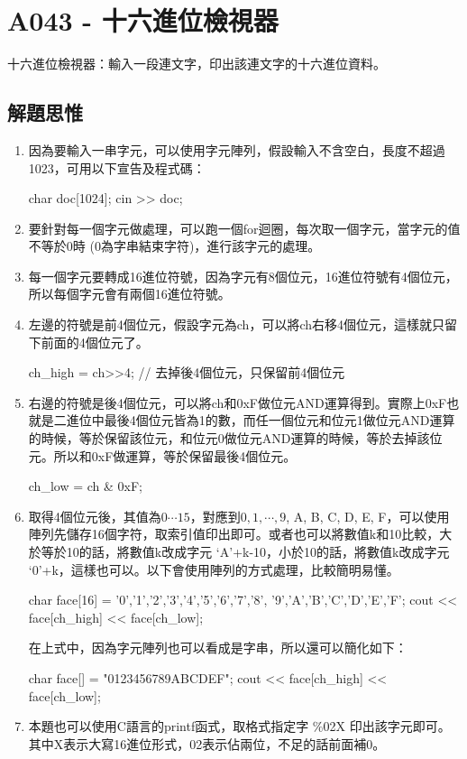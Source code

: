 \section{A043 - 十六進位檢視器}
十六進位檢視器：輸入一段連文字，印出該連文字的十六進位資料。

\subsection{解題思惟}
\begin{enumerate}
\item 因為要輸入一串字元，可以使用字元陣列，假設輸入不含空白，長度不超過1023，可用以下宣告及程式碼：
\begin{inside}
	char doc[1024];
	cin >> doc;
\end{inside}
\item 要針對每一個字元做處理，可以跑一個for迴圈，每次取一個字元，當字元的值不等於0時 (0為字串結束字符)，進行該字元的處理。
\begin{inside}
	for (int i=0; doc[i]; i++) { // 第i個字元 doc[i] 不為0時須處理
\end{inside}
\item 每一個字元要轉成16進位符號，因為字元有8個位元，16進位符號有4個位元，所以每個字元會有兩個16進位符號。
\item 左邊的符號是前4個位元，假設字元為ch，可以將ch右移4個位元，這樣就只留下前面的4個位元了。
\begin{inside}
	ch_high = ch>>4; // 去掉後4個位元，只保留前4個位元
\end{inside}
\item 右邊的符號是後4個位元，可以將ch和0xF做位元AND運算得到。實際上0xF也就是二進位中最後4個位元皆為1的數，而任一個位元和位元1做位元AND運算的時候，等於保留該位元，和位元0做位元AND運算的時候，等於去掉該位元。所以和0xF做運算，等於保留最後4個位元。
\begin{inside}
	ch_low = ch & 0xF;
\end{inside}
\item 取得4個位元後，其值為$0\cdots 15$，對應到$0,1,\cdots, 9$, A, B, C, D, E, F，可以使用陣列先儲存16個字符，取索引值印出即可。或者也可以將數值k和10比較，大於等於10的話，將數值k改成字元 `A'+k-10，小於10的話，將數值k改成字元 `0'+k，這樣也可以。以下會使用陣列的方式處理，比較簡明易懂。
\begin{inside}
	char face[16] = {'0','1','2','3','4','5','6','7','8',
					 '9','A','B','C','D','E','F'};
	cout << face[ch_high] << face[ch_low];
\end{inside}
在上式中，因為字元陣列也可以看成是字串，所以還可以簡化如下：
\begin{inside}
	char face[] = "0123456789ABCDEF";
	cout << face[ch_high] << face[ch_low];
\end{inside}
\item 本題也可以使用C語言的printf函式，取格式指定字 \%02X 印出該字元即可。其中X表示大寫16進位形式，02表示佔兩位，不足的話前面補0。
\end{enumerate}

